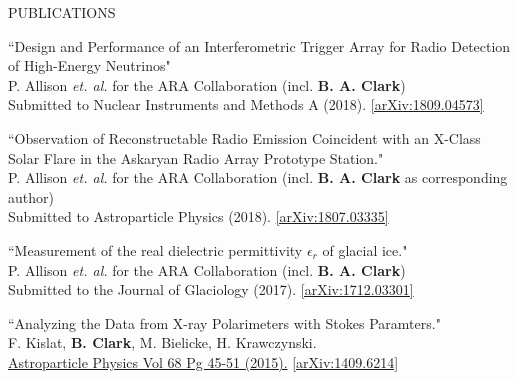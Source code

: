 \documentclass{resume} %
\begin{document}
\begin{rSection}{PUBLICATIONS}
\begin{etaremune}%
  \item ``Design and Performance of an Interferometric Trigger Array for Radio Detection of High-Energy Neutrinos" \\
 P. Allison {\it et. al.} for the ARA Collaboration (incl. \textbf{B. A. Clark}) \\
 Submitted to Nuclear Instruments and Methods A (2018). \href{https://arxiv.org/abs/1809.04573}{[arXiv:1809.04573]}
 \item ``Observation of Reconstructable Radio Emission Coincident with an X-Class Solar Flare in the Askaryan Radio Array Prototype Station." \\
 P. Allison {\it et. al.} for the ARA Collaboration (incl. \textbf{B. A. Clark} as corresponding author) \\
 Submitted to Astroparticle Physics (2018). \href{https://arxiv.org/abs/1807.03335}{[arXiv:1807.03335]}
  \item ``Measurement of the real dielectric permittivity $\epsilon_r$ of glacial ice." \\
 P. Allison {\it et. al.} for the ARA Collaboration (incl. \textbf{B. A. Clark}) \\
 Submitted to the Journal of Glaciology (2017). \href{https://arxiv.org/abs/1712.03301}{[arXiv:1712.03301]}
   \item ``Analyzing the Data from X-ray Polarimeters with Stokes Paramters." \\
 F. Kislat,  \textbf{B. Clark}, M. Bielicke, H. Krawczynski.  \\
  \href{http://dx.doi.org/10.1016/j.astropartphys.2015.02.007}{Astroparticle Physics Vol 68 Pg 45-51 (2015).} \href{https://arxiv.org/abs/1409.6214}{[arXiv:1409.6214]} 
 \end{etaremune}
\end{rSection}

\end{document}
